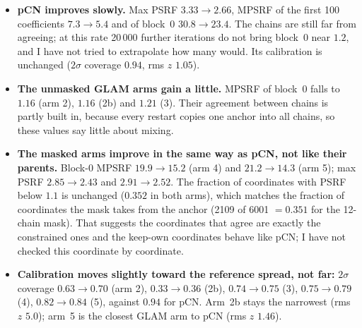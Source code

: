 \documentclass[11pt]{article}
\begin{document}
\begin{table}[h]\centering\small
\resizebox{\textwidth}{!}{}
\caption{80\,000 $\to$ 100\,000 iterations. MPSRF and PSRF as in Section~\ref{sec:calc}; the field statistics are over the plug cells.}
\end{table}

\begin{itemize}
\item \textbf{pCN improves slowly.} Max PSRF $3.33\to2.66$, MPSRF of the first 100 coefficients $7.3\to5.4$ and of block~0 $30.8\to23.4$. The chains are still far from agreeing; at this rate 20\,000 further iterations do not bring block~0 near $1.2$, and I have not tried to extrapolate how many would. Its calibration is unchanged ($2\sigma$ coverage $0.94$, rms $z$ $1.05$).
\item \textbf{The unmasked GLAM arms gain a little.} MPSRF of block~0 falls to $1.16$ (arm 2), $1.16$ (2b) and $1.21$ (3). Their agreement between chains is partly built in, because every restart copies one anchor into all chains, so these values say little about mixing.
\item \textbf{The masked arms improve in the same way as pCN, not like their parents.} Block-0 MPSRF $19.9\to15.2$ (arm 4) and $21.2\to14.3$ (arm 5); max PSRF $2.85\to2.43$ and $2.91\to2.52$. The fraction of coordinates with PSRF below $1.1$ is unchanged ($0.352$ in both arms), which matches the fraction of coordinates the mask takes from the anchor (2109 of 6001 $=0.351$ for the 12-chain mask). That suggests the coordinates that agree are exactly the constrained ones and the keep-own coordinates behave like pCN; I have not checked this coordinate by coordinate.
\item \textbf{Calibration moves slightly toward the reference spread, not far:} $2\sigma$ coverage $0.63\to0.70$ (arm 2), $0.33\to0.36$ (2b), $0.74\to0.75$ (3), $0.75\to0.79$ (4), $0.82\to0.84$ (5), against $0.94$ for pCN. Arm~2b stays the narrowest (rms $z$ $5.0$); arm~5 is the closest GLAM arm to pCN (rms $z$ $1.46$).
\end{itemize}
\end{document}
